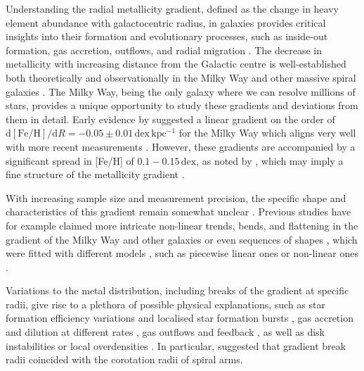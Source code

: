 \documentclass[twocolumn,apj,numberedappendix,appendixfloats,twocolappendix]{openjournal}
\begin{document}
\begin{CJK*}{UTF8}{gbsn}
Understanding the radial metallicity gradient, defined as the change in heavy element abundance with galactocentric radius, in galaxies provides critical insights into their formation and evolutionary processes, such as inside-out formation, gas accretion, outflows, and radial migration \citep[e.g.][]{Quirk1973, Tinsley1980, Lacey1985, Wyse1989, Kauffman1996, Chiappini1997, Schoenrich2009b, Moran2012, Bird2013}. The decrease in metallicity with increasing distance from the Galactic centre is well-established both theoretically \citep{Larson1976, Tinsley1980, Chiosi1980} and observationally in the Milky Way \citep{Searle1971, Janes1979, Twarog1997} and other massive spiral galaxies \citep[e.g.][]{Tinsley1980, Zaritsky1994,Bresolin2012}. The Milky Way, being the only galaxy where we can resolve millions of stars, provides a unique opportunity to study these gradients and deviations from them in detail. Early evidence by \citet{Janes1979} suggested a linear gradient on the order of $\mathrm{d{[Fe/H]}} / \mathrm{d}R = -0.05 \pm 0.01\,\mathrm{dex\,kpc^{-1}}$ for the Milky Way which aligns very well with more recent measurements \citep{Anders2017, Hayden2015}. However, these gradients are accompanied by a significant spread in [Fe/H] of $0.1-0.15\,\mathrm{dex}$, as noted by \citet{Twarog1980}, which may imply a fine structure of the metallicity gradient \citep[see][]{Genovali2014}.

With increasing sample size and measurement precision, the specific shape and characteristics of this gradient remain somewhat unclear \citep{Chiappini2002}. Previous studies have for example claimed more intricate non-linear trends, bends, and flattening in the gradient of the Milky Way \citep[e.g.][]{Donor2020} and other galaxies \citep[e.g.][]{Pilyugin2003, Sanchez2014} or even sequences of shapes \citep{Pilyugin2017, Pilyugin2024}, which were fitted with different models \citep{RosalesOrtega2011, Bresolin2012}, such as piecewise linear ones \citep[e.g.][]{SanchezMenguiano2016} or non-linear ones \citep[e.g.][]{Scarano2013}.

Variations to the metal distribution, including breaks of the gradient at specific radii, give rise to a plethora of possible physical explanations, such as star formation efficiency variations and localised star formation bursts \citep{Sanchez2014, SanchezBlazquez2014, Ho2015}, gas accretion and dilution at different rates \citep{Bresolin2012, Sanchez2013, Belfiore2016, SanchezMenguiano2016}, gas outflows and feedback \citep{Lilly2013, Ma2017b}, as well as disk instabilities or local overdensities \citep{Grand2016, Ho2017c}. In particular, \citet{Scarano2013} suggested that gradient break radii coincided with the corotation radii of spiral arms.


\end{CJK*}
\end{document}
